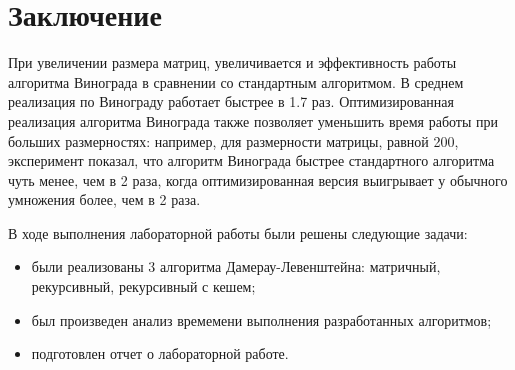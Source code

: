 \chapter*{Заключение}


При увеличении размера матриц, увеличивается и эффективность работы алгоритма Винограда в сравнении со стандартным алгоритмом. В среднем реализация по Винограду работает быстрее в 1.7 раз. Оптимизированная реализация алгоритма Винограда также позволяет уменьшить время работы при больших размерностях: например, для размерности матрицы, равной 200, эксперимент показал, что алгоритм Винограда быстрее стандартного алгоритма чуть менее, чем в 2 раза, когда оптимизированная версия выигрывает у обычного умножения более, чем в 2 раза. 


В ходе выполнения лабораторной работы были решены следующие задачи:

\begin{itemize}
	\item были реализованы 3 алгоритма Дамерау-Левенштейна: матричный, рекурсивный, рекурсивный с кешем;
	\item был произведен анализ времемени выполнения разработанных алгоритмов;
	\item подготовлен отчет о лабораторной работе.
\end{itemize}

